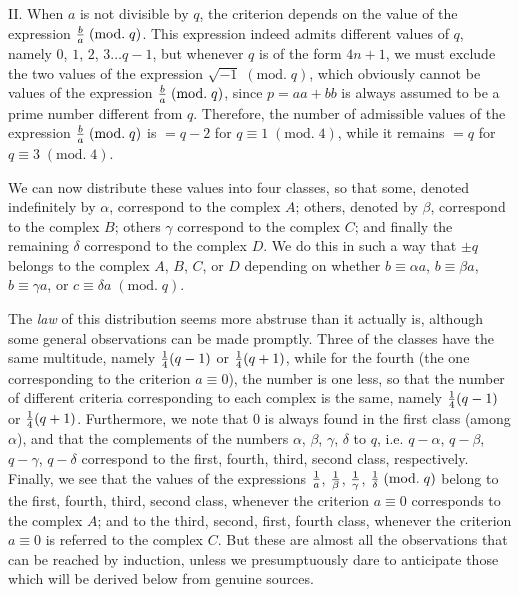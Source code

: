 \documentclass[twoside,12pt]{memoir}
\renewcommand{\pmod}[1]{\;(\textrm{mod.}\;#1)}
\let\oldfrac\frac
\def\frac#1#2{\mathchoice{\tfrac{#1}{#2}}{\oldfrac{#1}{#2}}{\genfrac{}{}{}{2}{#1}{#2\mathstrut}}{\genfrac{}{}{}{3}{#1}{#2\mathstrut}}}
\begin{document}
II. When \(a\) is not divisible by \(q\), the criterion depends on the value of the expression \(\frac{b}{a}\pmod{q}\). This expression indeed admits different values of \(q\), namely \(0\), \(1\), \(2\), \(3\ldots q-1\), but whenever \(q\) is of the form \(4n+1\), we must exclude the two values \pagebreak%
of the expression \(\sqrt{-1}\pmod{q}\), which obviously cannot be values of the expression \(\frac{b}{a}\pmod{q}\), since \(p=a a+b b\) is always assumed to be a prime number different from \(q\). Therefore, the number of admissible values of the expression \(\frac{b}{a}\pmod{q}\) is \(=q-2\) for \(q \equiv 1\pmod{4}\), while it remains \(=q\) for \(q \equiv 3\pmod{4}\).

We can now distribute these values into four classes, so that some, denoted indefinitely by \(\alpha\), correspond to the complex \(A\); others, denoted by \(\beta\), correspond to the complex \(B\); others \(\gamma\) correspond to the complex \(C\); and finally the remaining \(\delta\) correspond to the complex \(D\).  We do this in such a way that \(\pm q\) belongs to the complex \(A\), \(B\), \(C\), or \(D\) depending on whether \(b \equiv \alpha a\), \(b \equiv \beta a\), \(b \equiv \gamma a\), or \(c \equiv \delta a\pmod{q}\).

The \textit{law} of this distribution seems more abstruse than it actually is, although some general observations can be made promptly. Three of the classes have the same multitude, namely \(\frac{1}{4}(q-1)\) or \(\frac{1}{4}(q+1)\), while for the fourth (the one corresponding to the criterion \(a \equiv 0\)), the number is one less, so that the number of different criteria corresponding to each complex is the same, namely \(\frac{1}{4}(q-1)\) or \(\frac{1}{4}(q+1)\). Furthermore, we note that \(0\) is always found in the first class (among \(\alpha\)), and that the complements of the numbers \(\alpha\), \(\beta\), \(\gamma\), \(\delta\) to \(q\), i{.}e{.} \(q-\alpha\), \(q-\beta\), \(q-\gamma\), \(q-\delta\) correspond to the first, fourth, third, second class, respectively. Finally, we see that the values of the expressions \(\frac{1}{a}\), \(\frac{1}{\beta}\), \(\frac{1}{\gamma}\), \(\frac{1}{\delta} \pmod{q}\) belong to the first, fourth, third, second class, whenever the criterion \(a \equiv 0\) corresponds to the complex \(A\); and to the third, second, first, fourth class, whenever the criterion \(a \equiv 0\) is referred to the complex \(C\). But these are almost all the observations that can be reached by induction, unless we presumptuously dare to anticipate those which will be derived below from genuine sources.
\end{document}
